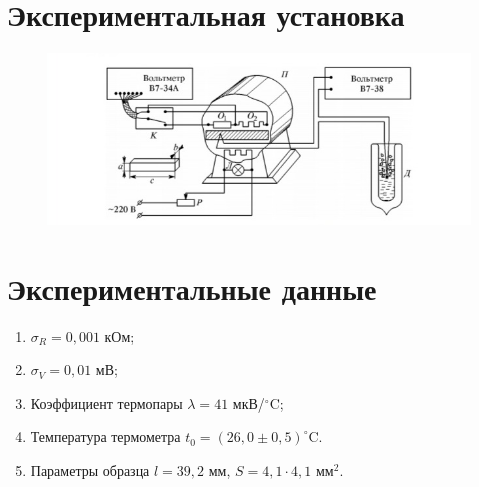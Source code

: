 \documentclass[a4paper,12pt]{article} %
\begin{document}
	\section{Экспериментальная установка}
	\begin{figure}[h!]
		\begin{floatrow}
			{\includegraphics[scale=0.7]{ustanovka}}    
		\end{floatrow}
	\end{figure}
	
	
	\newpage
	\section{Экспериментальные данные}
	\begin{enumerate}
		\item
		$\sigma_{R} = 0,001$ кОм;
		\item
		$\sigma_V = 0,01$ мВ;
		\item
		Коэффициент термопары
		$\lambda = 41$ мкВ/$^\circ$C;
		\item
		Температура термометра $t_0 = (26,0 \pm 0,5)^\circ$C.
		\item
		Параметры образца $l = 39,2$ мм, $S = 4,1\cdot4,1$ мм$^2$.
	\end{enumerate}
	
\end{document}
